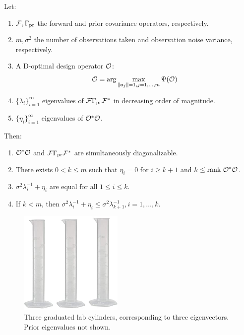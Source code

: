 \documentclass{amsart}
\numberwithin{equation}{section}
\begin{document}
\begin{theorem}\label{thm:char}
  Let:
  \begin{enumerate}
  \item $\mathcal{F}, \Gamma_{\textup{pr}}$ the forward and prior covariance operators, respectively.
  \item $m, \sigma^2$ the number of observations taken and observation
    noise variance, respectively.
  \item A D-optimal design operator $\mathcal{O}$:
    $$
    \mathcal{O} = \arg\max_{\|\mathbf{o}_j\| = 1, j=1,\dots,m}\Psi(\mathcal{O})
    $$ 
  \item $\{\lambda_i\}_{i=1}^\infty$ eigenvalues of $\mathcal{F}\Gamma_{\textup{pr}}\mathcal{F}^*$
    in decreasing order of magnitude.
  \item $\{\eta_i\}_{i=1}^\infty$ eigenvalues of $\mathcal{O}^*\mathcal{O}$.
  \end{enumerate}
  Then:
  \begin{enumerate}
  \item $\mathcal{O}^*\mathcal{O}$ and $\mathcal{F}\Gamma_{\textup{pr}}\mathcal{F}^*$ are simultaneously diagonalizable.
  \item There exists $0 < k \leq m$ such that $\eta_i = 0$ for $i\geq
    k+1$ and $k\leq\textup{rank}\  \mathcal{O}^*\mathcal{O}$.
  \item $\sigma^2\lambda_i^{-1} + \eta_i$ are equal for all $1 \leq i \leq k$.
  \item If $k < m$, then $\sigma^2\lambda_i^{-1} + \eta_i \leq
    \sigma^2\lambda_{k+1}^{-1}, i=1,\dots,k$.
  \end{enumerate}
\end{theorem}


\begin{figure}%
    \includegraphics[width=5cm, height=5cm]{cylinders.jpg}
    \caption{Three graduated lab cylinders, corresponding to three
      eigenvectors. Prior eigenvalues not shown.}
    \label{fig:cylinder}
\end{figure}
\end{document}

